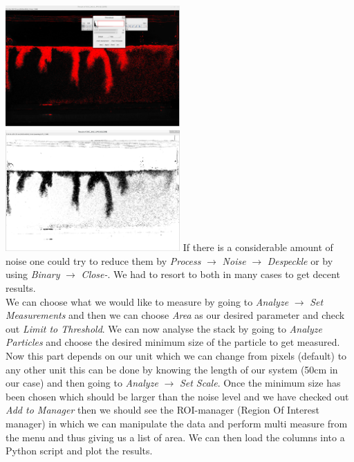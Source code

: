 \documentclass[twoside]{article}
\begin{document}
\begin{multicols}{2}
\includegraphics[width=0.5\textwidth]{thresh.png}\label{fig:thresh}
\vspace{0.3cm}
\includegraphics[width=0.5\textwidth]{final.png}\label{fig:final}
\vspace{0.3cm}
If there is a considerable amount of noise one could try to reduce them by \textit{Process} $\longrightarrow$ \textit{Noise} $\longrightarrow$ \textit{Despeckle} or by using \textit{Binary} $\longrightarrow$ \textit{Close-}. We had to resort to both in many cases to get decent results. \\
We can choose what we would like to measure by going to \textit{Analyze} $\longrightarrow$ \textit{Set Measurements} and then we can choose \textit{Area} as our desired parameter and check out \textit{Limit to Threshold}. We can now analyse the stack by going to \textit{Analyze Particles} and choose the desired minimum size of the particle to get measured. Now this part depends on our unit which we can change from pixels (default) to any other unit this can be done by knowing the length of our system (50cm in our case) and then going to \textit{Analyze} $\longrightarrow$ \textit{Set Scale}. Once the minimum size has been chosen which should be larger than the noise level and we have checked out \textit{Add to Manager} then we should see the ROI-manager (Region Of Interest manager) in which we can manipulate the data and perform multi measure from the menu and thus giving us a list of area. We can then load the columns into a Python script and plot the results.


\end{multicols}
\end{document}
